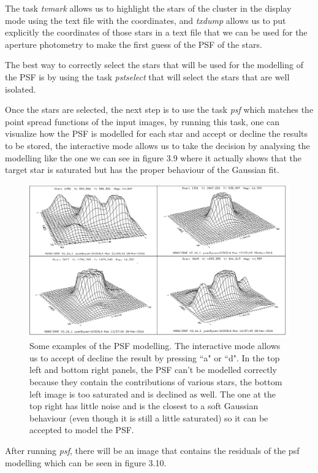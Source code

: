 The task \textit{tvmark} allows us to highlight the stars of the cluster in the display mode using the text file with the coordinates, and \textit{txdump} allows us to  put explicitly the coordinates of those stars in a text file that we can be used for the aperture photometry to make the first guess of the PSF of the stars.

The best way to correctly select the stars that will be used for the modelling of the PSF is by using the task \textit{pstselect} that will select the stars that are well isolated. 

Once the stars are selected, the next step is to use the task \textit{psf} which matches the point spread functions of the input images, by running this task, one can visualize how the PSF is modelled for each star and accept or decline the results to be stored, the interactive mode allows us to take the decision by analysing the modelling like the one we can see in figure 3.9 where it actually shows that the target star is saturated but has the proper behaviour of the Gaussian fit.

\begin{figure}[H]
\centering
\includegraphics[width=12cm]{images/psf.png}
\caption[PSF modelling]{Some examples of the PSF modelling. The interactive mode allows us to accept of decline the result by pressing ``a" or ``d". In the top left and bottom right panels, the PSF can't be modelled correctly because they contain the contributions of various stars, the bottom left image is too saturated and is declined as well. The one at the top right has little noise and is the closest to a soft Gaussian behaviour (even though it is still a little saturated) so it can be accepted to model the PSF.}
\end{figure}

After running \textit{psf}, there will be an image that contains the residuals of the psf modelling which can be seen in figure 3.10.

